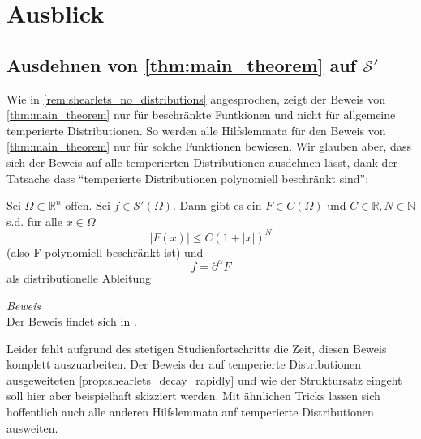 
\section{Ausblick} %
\label{sec:ausblick}

\subsection{\texorpdfstring{Ausdehnen von \cref{thm:main_theorem} auf $\mathcal{S}'$}{Ausdehnen auf Distributionen}} %
\label{sec:ausdehnen_von_thm:main_theorem}
Wie in \cref{rem:shearlets_no_distributions} angesprochen, zeigt der Beweis von \textcite{Kutyniok2008} \cref{thm:main_theorem} nur für beschränkte Funtkionen und nicht für allgemeine temperierte Distributionen. So werden alle Hilfslemmata für den Beweis von \cref{thm:main_theorem} nur für solche Funktionen bewiesen. Wir glauben aber, dass sich der Beweis auf alle temperierten Distributionen ausdehnen lässt, dank der Tatsache dass "`temperierte Distributionen polynomiell beschränkt sind"':

\begin{theorem}
\label{thm:struktursatz}
    Sei $\Omega \subset \mathbb{R}^n$ offen. Sei $f \in \mathcal{S}'(\Omega)$. Dann gibt es ein $F \in C(\Omega)$ und $C \in \mathbb{R}, N \in \mathbb{N}$ s.d. für alle $x \in \Omega$
    \begin{equation*}
        |F(x)| \leq C (1+|x| )^N
    \end{equation*}
    (also F polynomiell beschränkt ist) und
    \begin{equation*}
        f = \partial^\alpha F
    \end{equation*}
    als distributionelle Ableitung

    \emph{Beweis} \\[.3em]
    Der Beweis findet sich in \textcite[S. 97]{Friedlander1998}.
\end{theorem}


Leider fehlt aufgrund des stetigen Studienfortschritts die Zeit, diesen Beweis komplett auszuarbeiten. Der Beweis der auf temperierte Distributionen ausgeweiteten \cref{prop:shearlets_decay_rapidly} und wie der Struktursatz eingeht soll hier aber beispielhaft skizziert werden.  Mit ähnlichen Tricks lassen sich hoffentlich auch alle anderen Hilfslemmata auf temperierte Distributionen ausweiten.

